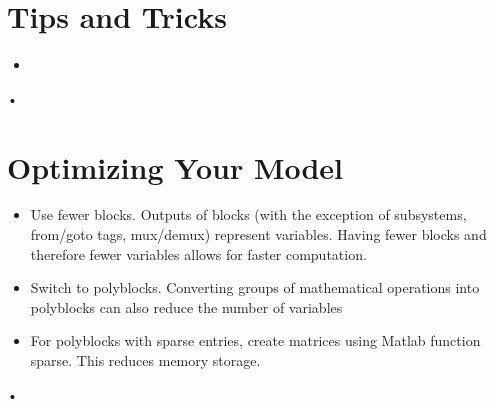 \documentclass[12pt]{report}
\begin{document}
\section{Tips and Tricks}
\begin{itemize}
\item 

\end{itemize}•

\section{Optimizing Your Model}
\begin{itemize}
\item Use fewer blocks.  Outputs of blocks (with the exception of subsystems, from/goto tags, mux/demux) represent variables.  Having fewer blocks and therefore fewer variables allows for faster computation.
\item Switch to polyblocks.  Converting groups of mathematical operations into polyblocks can also reduce the number of variables
\item For polyblocks with sparse entries, create matrices using Matlab function sparse.  This reduces memory storage.
\end{itemize}•

\clearpage
\end{document}

